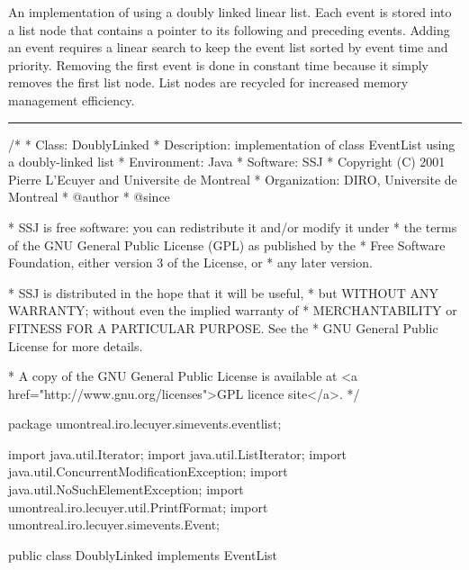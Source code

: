 
An implementation of  using a doubly linked linear list.
Each event is stored into a list node that contains a pointer to its following
and preceding events.  Adding an event requires a linear search to keep the
event list sorted by event time and priority. Removing the first event is
done in constant time because it simply removes the first list node.
List nodes are recycled for increased memory management efficiency.

\bigskip\hrule

\begin{code}
\begin{hide}
/*
 * Class:        DoublyLinked
 * Description:  implementation of class EventList using a doubly-linked list
 * Environment:  Java
 * Software:     SSJ 
 * Copyright (C) 2001  Pierre L'Ecuyer and Universite de Montreal
 * Organization: DIRO, Universite de Montreal
 * @author       
 * @since

 * SSJ is free software: you can redistribute it and/or modify it under
 * the terms of the GNU General Public License (GPL) as published by the
 * Free Software Foundation, either version 3 of the License, or
 * any later version.

 * SSJ is distributed in the hope that it will be useful,
 * but WITHOUT ANY WARRANTY; without even the implied warranty of
 * MERCHANTABILITY or FITNESS FOR A PARTICULAR PURPOSE.  See the
 * GNU General Public License for more details.

 * A copy of the GNU General Public License is available at
   <a href="http://www.gnu.org/licenses">GPL licence site</a>.
 */
\end{hide}
package umontreal.iro.lecuyer.simevents.eventlist; \begin{hide}
import java.util.Iterator;
import java.util.ListIterator;
import java.util.ConcurrentModificationException;
import java.util.NoSuchElementException;
import umontreal.iro.lecuyer.util.PrintfFormat;
import umontreal.iro.lecuyer.simevents.Event;
\end{hide}

public class DoublyLinked implements EventList\begin{hide} {
   private int modCount = 0;

   // First and last elements in the list.
   private Node first = null, last = null;
   private static Node free = null;     // Pointer to stack of free nodes.
\end{hide}
\end{code}\begin{hide}\begin{code}


\end{code}
\end{hide}

